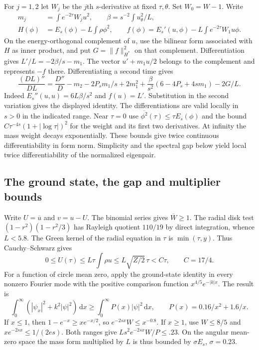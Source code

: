 \documentclass[11pt,a4paper,reqno]{amsart}
\theoremstyle{remark}
\numberwithin{equation}{section}
\newcommand{\dd}{\,\mathrm d}
\newcommand{\av}[1]{\overline{#1}}
\begin{document}
For $j=1,2$ let $W_j$ be the $j$th $s$-derivative at fixed $\tau,\theta$.
Set $W_0=W-1$. Write
\begin{align*}
 m_j&=\int e^{-2\tau}W_j u^2,\qquad
 \beta=s^{-2}\int u_\theta^2/L,\\
 H(\phi)&=E_s(\phi)-L\int\rho\phi^2,\qquad
 f(\phi)=E_s'(u,\phi)-L\int e^{-2\tau}W_1u\phi .
\end{align*}
On the energy-orthogonal complement of $u$, use the bilinear form associated
with $H$ as inner product, and put $G=\|f\|_{H^*}^2$ on that complement.
Differentiation gives $L'/L=-2\beta/s-m_1$. The vector
$u'+m_1u/2$ belongs to the complement and represents $-f$ there.
Differentiating a second time gives
\[
 \frac{(DL)''}{DL}=\frac{D''}{D}-m_2-2P_sm_1/s+2m_1^2+
       \frac{\beta}{s^2}(6-4P_s+4sm_1)-2G/L .
 \tag{A.3}\label{eq:acute5}
\]
Indeed $E_s''(u,u)=6L\beta/s^2$ and $f(u)=L'$. Substitution in the second
variation gives the displayed identity. The differentiations are valid
locally in $s>0$ in the indicated range. Near $\tau=0$ use
$\av{\phi^2}(\tau)\le\tau E_s(\phi)$ and the bound
$C\tau^{-4s}(1+|\log\tau|)^2$ for the weight and its first two
derivatives. At infinity the mass weight decays exponentially. These
bounds give twice continuous differentiability in form norm. Simplicity
and the spectral gap below yield local twice differentiability of the
normalized eigenpair.

\subsection{The ground state, the gap and multiplier bounds}
Write $U=\av u$ and $v=u-U$. The binomial series gives $\av W\ge1$.
The radial disk test $(1-r^2)(1-r^2/3)$ has Rayleigh quotient $110/19$
by direct integration, whence $L<5.8$. The Green kernel of the radial
equation in $\tau$ is $\min(\tau,y)$. Thus Cauchy--Schwarz gives
\[
       0\le U(\tau)\le L\tau\int\rho u
        \le L\sqrt{Z/2}\,\tau<C\tau,\qquad C=17/4 .
 \tag{A.4}\label{eq:acute6}
\]
For a function of circle mean zero, apply the ground-state identity in
every nonzero Fourier mode with the positive comparison function
$x^{4/5}e^{-|k|x}$. The result is
\[
  \int_0^\infty(|\psi_x|^2+k^2|\psi|^2)\dd x
  \ge\int_0^\infty P(x)|\psi|^2\dd x,\qquad P(x)=0.16/x^2+1.6/x .
 \tag{A.5}\label{eq:acute7}
\]
If $x\le1$, then $1-e^{-x}\ge xe^{-x/2}$, so $e^{-2sx}W\le x^{-0.8}$.
If $x\ge1$, use $W\le8/5$ and $xe^{-2sx}\le1/(2es)$. Both ranges give
$Ls^2e^{-2sx}W/P\le.23$. On the angular mean-zero space the mass form
multiplied by $L$ is thus bounded by $\sigma E_s$, $\sigma=0.23$.
\end{document}
